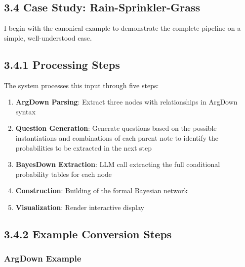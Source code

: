 \documentclass[
  11pt,
  letterpaper,
]{book}
\providecommand{\tightlist}{%
  \setlength{\itemsep}{0pt}\setlength{\parskip}{0pt}}
\begin{document}
\begin{landscape}

\section*{3.4 Case Study:
Rain-Sprinkler-Grass}\label{sec-case-rain-sprinkler}


I begin with the canonical example to demonstrate the complete pipeline
on a simple, well-understood case.

\subsection*{3.4.1 Processing Steps}\label{sec-rsg-processing}

The system processes this input through five steps:

\begin{enumerate}
\def\labelenumi{\arabic{enumi}.}
\tightlist
\item
  \textbf{ArgDown Parsing}: Extract three nodes with relationships in
  ArgDown syntax
\item
  \textbf{Question Generation}: Generate questions based on the possible
  instantiations and combinations of each parent note to identify the
  probabilities to be extracted in the next step
\item
  \textbf{BayesDown Extraction}: LLM call extracting the full
  conditional probability tables for each node
\item
  \textbf{Construction}: Building of the formal Bayesian network
\item
  \textbf{Visualization}: Render interactive display
\end{enumerate}

\subsection*{3.4.2 Example Conversion Steps}\label{sec-rsg-input}

\subsubsection*{ArgDown Example}\label{argdown-example}


\end{landscape}
\end{document}

